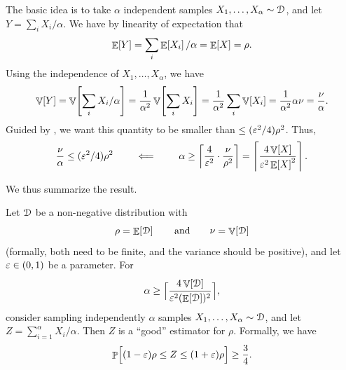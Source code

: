 The basic idea is to take $\alpha$ independent samples
$X_1, \ldots, X_\alpha \sim \EuScript{D}$, and let
$Y = \sum_i X_i / \alpha$. We have by linearity of expectation that
\begin{equation*}
    \mathop{\mathbb{E}}\!\left[ {Y} \right] = \sum_i \mathop{\mathbb{E}}\!\left[ {X_i} \right]/\alpha = \mathop{\mathbb{E}}\!\left[ {X} \right] = \rho.
\end{equation*}
Using the independence of $X_1, \ldots, X_\alpha$, we have
\begin{equation*}
    \Var{Y}%
    =%
    \Var{\sum_i X_i /\alpha}
    =%
    \frac{1}{\alpha^2}\Var{\sum_i X_i}
    =%
    \frac{1}{\alpha^2}\sum_i \Var{X_i}
    =%
    \frac{1}{\alpha^2} \alpha \nu
    =%
    \frac{\nu}{\alpha}.
\end{equation*}
Guided by , we want this quantity to be smaller
than $\leq ({\varepsilon}^2/4) \rho^2$. Thus,
\begin{equation*}
    \frac{\nu}{\alpha}
    \leq (\eps^2/4) \rho^2
    \qquad\impliedby\qquad%
    \alpha \geq \ceil{\frac{4}{\eps^2} \cdot \frac{\nu}{\rho^2}
    }
    = \ceil{ \frac{4 \Var{X}}{\eps^2\Ex{X}^2}
    }.
\end{equation*}

We thus summarize the result.
\begin{lemma}
    Let $\EuScript{D}$ be a non-negative distribution with
    \begin{equation*}
        \rho = \mathop{\mathbb{E}}\!\left[ {\EuScript{D}} \right]
        \qquad\text{and}\qquad
        \nu = \mathop{\mathbb{V}}\!\left[ {\EuScript{D}} \right]
    \end{equation*}
    (formally, both need to be finite, and the variance should be
    positive), and let ${\varepsilon} \in (0,1)$ be a parameter.  For
    \begin{equation*}
        \displaystyle%
        \alpha\geq \Bigl\lceil{ \frac{4 \VarSymb[\Distribution]\bigr.}
           {\eps^2(\ExSym[\Distribution])^2\bigr.}  } \Bigr\rceil,
    \end{equation*}
    consider sampling independently $\alpha$ samples
    $X_1, \ldots, X_\alpha \sim \EuScript{D}$, and let
    $Z = \sum_{i=1}^\alpha X_i /\alpha$. Then $Z$ is a ``good'' estimator for
    $\rho$. Formally, we have
    \begin{equation*}
        \Prob{ (1-\eps)\rho \leq Z \leq (1+\eps)\rho \Bigr.} \geq \frac{3}{4}.
    \end{equation*}
\end{lemma}



